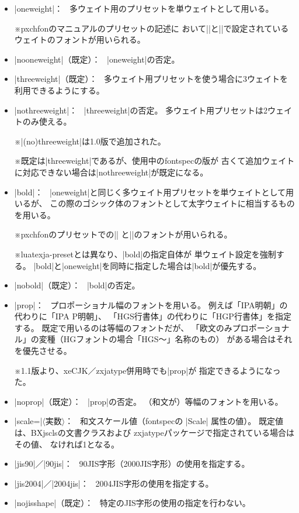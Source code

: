 \documentclass[xelatex,ja=standard,jafont=ipaex,
  a4paper]{bxjsarticle}
\newcommand{\Pkg}[1]{\textsf{#1}}
\newcommand{\Meta}[1]{$\langle$\mbox{}#1\mbox{}$\rangle$}
\newcommand{\Note}{\par\noindent ※}
\newcommand{\Means}{：\ }
\newcommand{\JSl}{\mbox{／}\linebreak[0]}
\begin{document}
\begin{itemize}
\item |oneweight|\Means
多ウェイト用のプリセットを単ウェイトとして用いる。
\Note \Pkg{pxchfon}のマニュアルのプリセットの記述に
おいて\>|\setminchofont|\>と\>|\setgothicfont|\>で設定されている
ウェイトのフォントが用いられる。
\item |nooneweight|（既定）\Means
|oneweight|\>の否定。

\item |threeweight|（既定）\Means
多ウェイト用プリセットを使う場合に3ウェイトを利用できるようにする。
\item |nothreeweight|\Means
|threeweight|\>の否定。
多ウェイト用プリセットは2ウェイトのみ使える。
\Note |(no)threeweight|\>は1.0版で追加された。
\Note 既定は\>|threeweight|\>であるが、使用中の\Pkg{fontspec}の版が
古くて追加ウェイトに対応できない場合は\>|nothreeweight|\>が既定になる。

\item |bold|\Means
|oneweight|\>と同じく多ウェイト用プリセットを単ウェイトとして用いるが、
この際のゴシック体のフォントとして太字ウェイトに相当するものを用いる。
\Note \Pkg{pxchfon}のプリセットでの\>|\setminchofont|\>%
と\>|\setboldgothicfont|\>のフォントが用いられる。
\Note \Pkg{luatexja-preset}とは異なり、|bold|\>の指定自体が
単ウェイト設定を強制する。
|bold|\>と\>|oneweight|\>を同時に指定した場合は\>|bold|\>が優先する。
\item |nobold|（既定）\Means
|bold|\>の否定。

\item |prop|\Means
プロポーショナル幅のフォントを用いる。
例えば「IPA明朝」の代わりに「IPA P明朝」、
「HGS行書体」の代わりに「HGP行書体」を指定する。
既定で用いるのは等幅のフォントだが、
「欧文のみプロポーショナル」の変種（HGフォントの場合「HGS～」名称のもの）
がある場合はそれを優先させる。
\Note 1.1版より、\Pkg{xeCJK}\JSl\Pkg{zxjatype}併用時でも\>|prop|\>が
指定できるようになった。
\item |noprop|（既定）\Means
|prop|\>の否定。
（和文が）等幅のフォントを用いる。

\item |scale=|\Meta{実数}\Means
和文スケール値（\Pkg{fontspec}の |Scale| 属性の値）。
既定値は、\Pkg{BXjscls}の文書クラスおよび
\Pkg{zxjatype}パッケージで指定されている場合はその値、
なければ1となる。

\item |jis90|\JSl|90jis|\Means
90JIS字形（2000JIS字形）の使用を指定する。
\item |jis2004|\JSl|2004jis|\Means
2004JIS字形の使用を指定する。
\item |nojisshape|（既定）\Means
特定のJIS字形の使用の指定を行わない。


\end{itemize}
\end{document}
